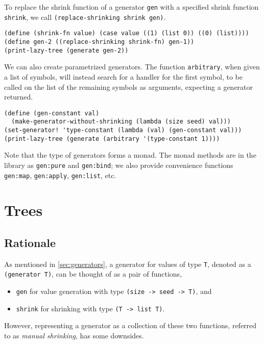 \documentclass{scrartcl}
\begin{document}
To replace the shrink function of a generator \verb|gen| with a specified shrink
function \verb|shrink|, we call \verb|(replace-shrinking shrink gen)|.

\begin{verbatim}
(define (shrink-fn value) (case value ((1) (list 0)) ((0) (list))))
(define gen-2 ((replace-shrinking shrink-fn) gen-1))
(print-lazy-tree (generate gen-2))
\end{verbatim}

We can also create parametrized generators. The function \verb|arbitrary|, when
given a list of symbols, will instead search for a handler for the first symbol,
to be called on the list of the remaining symbols as arguments, expecting a
generator returned.

\begin{verbatim}
(define (gen-constant val)
  (make-generator-without-shrinking (lambda (size seed) val)))
(set-generator! 'type-constant (lambda (val) (gen-constant val)))
(print-lazy-tree (generate (arbitrary '(type-constant 1))))
\end{verbatim}

Note that the type of generators forms a monad. The monad methods are in the
library as \verb|gen:pure| and \verb|gen:bind|; we also provide convenience
functions \verb|gen:map|, \verb|gen:apply|, \verb|gen:list|, etc.

\section{Trees}\label{sec:trees}
\subsection{Rationale}
As mentioned in \cref{sec:generators}, a generator for values of type \verb|T|,
denoted as a \verb|(generator T)|,
can be thought of as a pair of functions,
\begin{itemize}
  \item \verb|gen| for value generation
        with type \verb|(size -> seed -> T)|, and
  \item \verb|shrink| for shrinking with type \verb|(T -> list T)|.
\end{itemize}
However, representing a generator as a collection of these two functions,
referred to as \emph{manual shrinking}, has some downsides.
\end{document}
